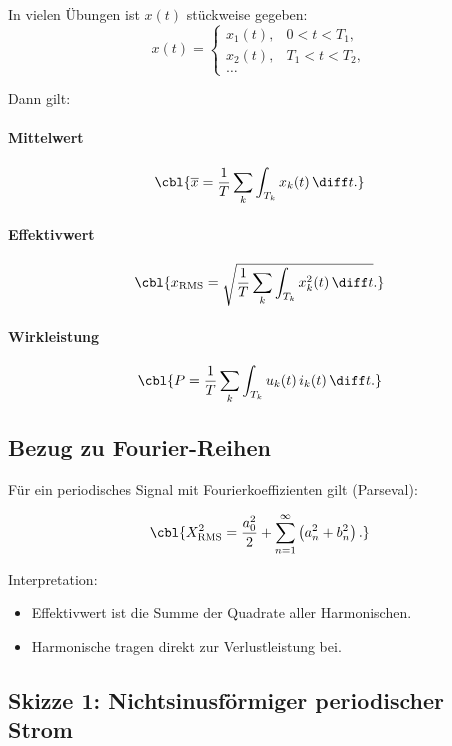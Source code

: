 In vielen Übungen ist $x(t)$ stückweise gegeben:
\[
x(t) =
\begin{cases}
x_1(t), & 0 < t < T_1,\\
x_2(t), & T_1 < t < T_2,\\
\dots
\end{cases}
\]

Dann gilt:

\paragraph{Mittelwert}
\[
\cbl{\overline{x} = \frac{1}{T} \sum_k \int_{T_k} x_k(t)\,\diff t.}
\]

\paragraph{Effektivwert}
\[
\cbl{x_{\mathrm{RMS}} = \sqrt{ \frac{1}{T} \sum_k \int_{T_k} x_k^2(t)\,\diff t }.}
\]

\paragraph{Wirkleistung}
\[
\cbl{P = \frac{1}{T} \sum_k \int_{T_k} u_k(t)\, i_k(t)\,\diff t.}
\]


\subsection{Bezug zu Fourier-Reihen}

Für ein periodisches Signal mit Fourierkoeffizienten gilt (Parseval):

\[
\cbl{X_{\mathrm{RMS}}^2 = \frac{a_0^2}{2} + \sum_{n=1}^\infty \left( a_n^2 + b_n^2 \right).}
\]

Interpretation:
\begin{itemize}
    \item Effektivwert ist die Summe der Quadrate aller Harmonischen.
    \item Harmonische tragen direkt zur Verlustleistung bei.
\end{itemize}

\subsection{Skizze 1: Nichtsinusförmiger periodischer Strom}

\begin{center}
\end{center}

